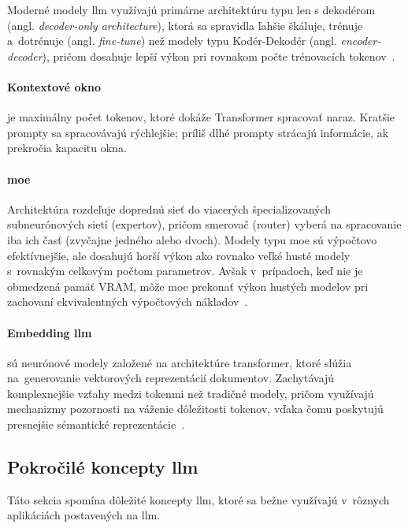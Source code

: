 Moderné modely \gls{llm} využívajú primárne architektúru typu len s dekodérom (angl. \textsl{decoder-only architecture}), ktorá sa spravidla ľahšie škáluje, trénuje a~dotrénuje (angl. \textsl{fine-tune}) než modely typu Kodér-Dekodér (angl. \textsl{encoder-decoder}), pričom dosahuje lepší výkon pri rovnakom počte trénovacích tokenov~\cite{zhao2023,wei2023chainofthoughtpromptingelicitsreasoning}.

\paragraph{Kontextové okno} je maximálny počet tokenov, ktoré dokáže Transformer spracovať naraz. Kratšie prompty sa spracovávajú rýchlejšie; príliš dlhé prompty strácajú informácie, ak prekročia kapacitu okna.

\paragraph{\gls{moe}}
Architektúra rozdeľuje doprednú sieť do viacerých špecializovaných subneurónových sietí (expertov), pričom smerovač (router) vyberá na spracovanie iba ich časť (zvyčajne jedného alebo dvoch).
Modely typu \gls{moe} sú výpočtovo efektívnejšie, ale dosahujú horší výkon ako rovnako veľké husté modely s~rovnakým celkovým počtom parametrov. Avšak v~prípadoch, keď nie je obmedzená pamäť VRAM, môže \gls{moe} prekonať výkon hustých modelov pri zachovaní ekvivalentných výpočtových nákladov~\cite{dai2024deepseekmoe}.

\paragraph{Embedding \gls{llm}} sú neurónové modely založené na architektúre transformer, ktoré slúžia na~generovanie vektorových reprezentácií dokumentov.
Zachytávajú komplexnejšie vzťahy medzi tokenmi než tradičné modely, pričom využívajú mechanizmy pozornosti na váženie dôležitosti tokenov, vďaka čomu poskytujú presnejšie sémantické reprezentácie~\cite{zhang2024systematicsurveytextsummarization,khan2026retrieval}.

\subsection*{Pokročilé koncepty \gls{llm}}

Táto sekcia spomína dôležité koncepty \gls{llm}, ktoré sa bežne využívajú v~rôznych aplikáciách postavených na \gls{llm}.


